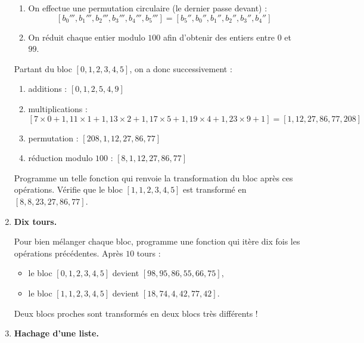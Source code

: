 \documentclass[11pt,class=report,crop=false]{standalone}
\begin{document}
\begin{activite}
\begin{enumerate}
\begin{enumerate}
    \item On effectue une permutation circulaire (le dernier passe devant) :
    $$[b_0''',b_1''',b_2''',b_3''',b_4''',b_5'''] = [b_5'',b_0'',b_1'',b_2'',b_3'',b_4'']$$
    
    \item On réduit chaque entier modulo $100$ afin d'obtenir des entiers entre $0$ et $99$.
  \end{enumerate}



  
  Partant du bloc $[0, 1, 2, 3, 4, 5]$, on a donc successivement :
   \begin{enumerate}
    \item additions : $[0, 1, 2, 5, 4, 9]$
    
    \item multiplications : $[7\times 0 + 1, 11\times 1+1, 13\times 2+1, 17 \times 5+1,19 \times  4+1, 23 \times 9+1] = [1,12,27,86,77,208]$ 
    
    \item permutation : $[208,1,12,27,86,77]$
    
    \item réduction modulo $100$ : $[8,1,12,27,86,77]$
  \end{enumerate}
  
  Programme un telle fonction  qui renvoie la transformation du bloc après ces opérations. Vérifie que le bloc $[1, 1, 2, 3, 4, 5]$ est transformé en $[8, 8, 23, 27, 86, 77]$.
 
    \item \textbf{Dix tours.} 
    
    Pour bien mélanger chaque bloc, programme une fonction   qui itère dix fois les opérations précédentes.
    Après $10$ tours :
    \begin{itemize}
      \item le bloc $[0, 1, 2, 3, 4, 5]$ devient $[98, 95, 86, 55, 66, 75]$,
      \item le bloc $[1, 1, 2, 3, 4, 5]$ devient $[18, 74, 4, 42, 77, 42]$.
    \end{itemize}
 Deux blocs proches sont transformés en deux blocs très différents ! 
   
   \item \textbf{Hachage d'une liste.} 
   

\end{enumerate}
\end{activite}
\end{document}
